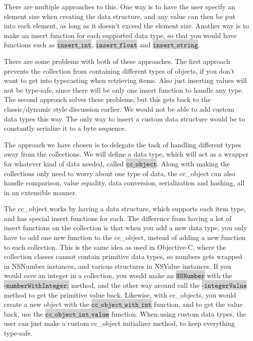 \documentclass[table]{ituthesis}
\newcommand{\highlight}[1]{\colorbox{lightGray}{$\displaystyle \texttt{#1}$}}
\begin{document}
There are multiple approaches to this. One way is to have the user specify an element size when creating the data structure, and any value can then be put into each element, as long as it doesn't exceed the element size. Another way is to make an insert function for each supported data type, so that you would have functions such as \highlight{insert\_int}, \highlight{insert\_float} and \highlight{insert\_string}.

There are some problems with both of these approaches. The first approach prevents the collection from containing different types of objects, if you don't want to get into typecasting when retrieving items. Also just inserting values will not be type-safe, since there will be only one insert function to handle any type. The second approach solves these problems, but this gets back to the classic/dynamic style discussion earlier. We would not be able to add custom data types this way. The only way to insert a custom data structure would be to constantly serialize it to a byte sequence.

The approach we have chosen is to delegate the task of handling different types away from the collections. We will define a data type, which will act as a wrapper for whatever kind of data needed, called \highlight{cc\_object}. Along with making the collections only need to worry about one type of data, the cc\_object can also handle comparison, value equality, data conversion, serialization and hashing, all in an extensible manner.

The cc\_object works by having a data structure, which supports each item type, and has special insert functions for each. The difference from having a lot of insert functions on the collection is that when you add a new data type, you only have to add one new function to the cc\_object, instead of adding a new function to each collection. This is the same idea as used in Objective-C, where the collection classes cannot contain primitive data types, so numbers gets wrapped in NSNumber instances, and various structures in NSValue instances. If you would save an integer in a collection, you would make an \highlight{NSNumber} with the \highlight{-numberWithInteger:} method, and the other way around call the \highlight{-integerValue} method to get the primitive value back. Likewise, with cc\_objects, you would create a new object with the \highlight{cc\_object\_with\_int} function, and to get the value back, use the \highlight{cc\_object\_int\_value} function. When using custom data types, the user can just make a custom cc\_object initializer method, to keep everything type-safe.
\end{document}
